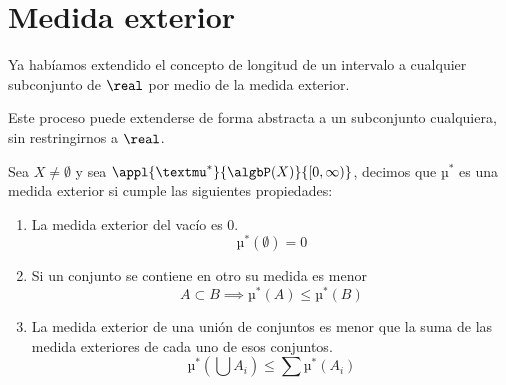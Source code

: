 \documentclass{apuntes}
\begin{document}
\section{Medida exterior}
Ya habíamos extendido el concepto de longitud de un intervalo a cualquier subconjunto de $\real$ por medio de la medida exterior.

Este proceso puede extenderse de forma abstracta a un subconjunto cualquiera, sin restringirnos a $\real$.

\begin{defn}
Sea $X \neq \emptyset$ y sea $\appl{µ^*}{\algbP(X)}{[0, \infty)}$, decimos que $µ^*$ es una medida exterior si cumple las siguientes propiedades:
\begin{enumerate}
\item La medida exterior del vacío es 0.
\[µ^*(\emptyset) = 0\]
\item Si un conjunto se contiene en otro su medida es menor
\[A \subset B \implies µ^*(A) \leq µ^*(B)\]
\item La medida exterior de una unión de conjuntos es menor que la suma de las medida exteriores de cada uno de esos conjuntos.
\[µ^*(\bigcup A_i) \leq \sum µ^*(A_i)\]
\end{enumerate}
\end{defn}
\end{document}
